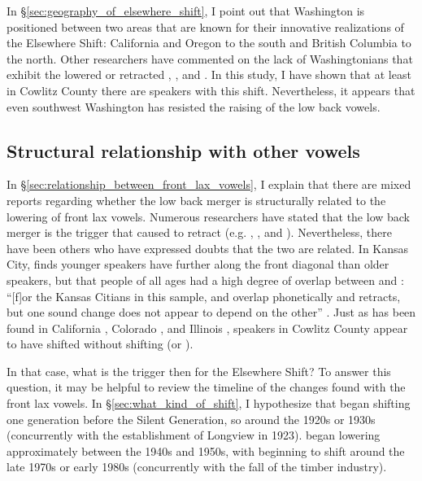 In \S\ref{sec:geography_of_elsewhere_shift}, I point out that Washington is positioned between two areas that are known for their innovative realizations of the Elsewhere Shift: California and Oregon to the south and British Columbia to the north. Other researchers have commented on the lack of Washingtonians that exhibit the lowered or retracted \bat, \bet, and \bit. In this study, I have shown that at least in Cowlitz County there are speakers with this shift. Nevertheless, it appears that even southwest Washington has resisted the raising of the low back vowels.



\subsection{Structural relationship with other vowels}

In \S\ref{sec:relationship_between_front_lax_vowels}, I explain that there are mixed reports regarding whether the low back merger is structurally related to the lowering of front lax vowels. Numerous researchers have stated that the low back merger is the trigger that caused \trap to retract (e.g. \citealt[212]{clarke_etal_1995}, \citealt[139]{gordon_2006}, and \citealt[220]{labov_ash_boberg_2006_anae}). Nevertheless, there have been others who have expressed doubts that the two are related. In Kansas City, \citeauthor{strelluf_2019} finds younger speakers have \trap further along the front diagonal than older speakers, but that people of all ages had a high degree of overlap between \lot and \thought: ``[f]or the Kansas Citians in this sample, \lot and \thought overlap phonetically and \trap retracts, but one sound change does not appear to depend on the other'' \citeyearpar[76]{strelluf_2019}. Just as has been found in California \citep{kennedy_grama_2012}, Colorado \citep{holland_2014_diss}, and Illinois \citep{bigham_2010}, speakers in Cowlitz County appear to have shifted \trap without shifting \lot (or \thought).

In that case, what is the trigger then for the Elsewhere Shift? To answer this question, it may be helpful to review the timeline of the changes found with the front lax vowels. In \S\ref{sec:what_kind_of_shift}, I hypothesize that \bat began shifting one generation before the Silent Generation, so around the 1920s or 1930s (concurrently with the establishment of Longview in 1923). \bet began lowering approximately between the 1940s and 1950s, with \bit beginning to shift around the late 1970s or early 1980s (concurrently with the fall of the timber industry).

